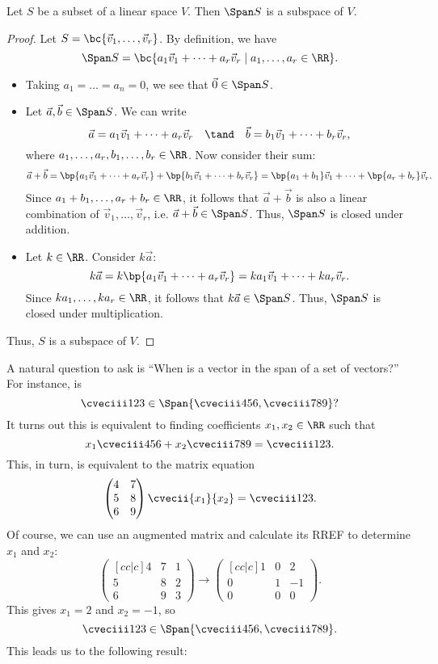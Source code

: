 \begin{proposition}
    Let $S$ be a subset of a linear space $V$. Then $\Span S$ is a subspace of $V$.
\end{proposition}
\begin{proof}
    Let $S = \bc{\vec v_1, \dots, \vec v_r}$. By definition, we have \[\Span S = \bc{a_1 \vec v_1 + \dots + a_r \vec v_r \mid a_1, \dots, a_r \in \RR}.\]
    \begin{itemize}
        \item Taking $a_1 = \dots = a_n = 0$, we see that $\vec 0 \in \Span S$.
        \item Let $\vec a, \vec b \in \Span S$. We can write \[\vec a = a_1 \vec v_1 + \dots + a_r \vec v_r \quad \tand \quad \vec b = b_1 \vec v_1 + \dots + b_r \vec v_r,\] where $a_1, \dots, a_r, b_1, \dots, b_r \in \RR$. Now consider their sum: \[\vec a + \vec b = \bp{a_1 \vec v_1 + \dots + a_r \vec v_r} + \bp{b_1 \vec v_1 + \dots + b_r \vec v_r} = \bp{a_1 + b_1} \vec v_1 + \dots + \bp{a_r + b_r} \vec v_r.\] Since $a_1 + b_1, \dots, a_r + b_r \in \RR$, it follows that $\vec a + \vec b$ is also a linear combination of $\vec v_1, \dots, \vec v_r$, i.e. $\vec a + \vec b \in \Span S$. Thus, $\Span S$ is closed under addition.
        \item Let $k \in \RR$. Consider $k \vec a$: \[k \vec a = k \bp{a_1 \vec v_1 + \dots + a_r \vec v_r} = ka_1 \vec v_1 + \dots + ka_r \vec v_r.\] Since $ka_1, \dots, ka_r \in \RR$, it follows that $k\vec a \in \Span S$. Thus, $\Span S$ is closed under multiplication.
    \end{itemize}
    Thus, $S$ is a subspace of $V$.
\end{proof}

A natural question to ask is ``When is a vector in the span of a set of vectors?'' For instance, is \[\cveciii123 \in \Span{\cveciii456, \cveciii789}?\] It turns out this is equivalent to finding coefficients $x_1, x_2 \in \RR$ such that \[x_1 \cveciii456 + x_2 \cveciii789 = \cveciii123.\] This, in turn, is equivalent to the matrix equation \[\begin{pmatrix}4 & 7 \\ 5 & 8 \\ 6 & 9\end{pmatrix} \cvecii{x_1}{x_2} = \cveciii123.\] Of course, we can use an augmented matrix and calculate its RREF to determine $x_1$ and $x_2$: \[\begin{pmatrix}[cc|c]4 & 7 & 1 \\ 5 & 8 & 2 \\ 6 & 9 & 3\end{pmatrix} \rightarrow \begin{pmatrix}[cc|c] 1 & 0 & 2 \\ 0 & 1 & -1 \\ 0 & 0 & 0\end{pmatrix}.\] This gives $x_1 = 2$ and $x_2 = -1$, so \[\cveciii123 \in \Span{\cveciii456, \cveciii789}.\] This leads us to the following result:

